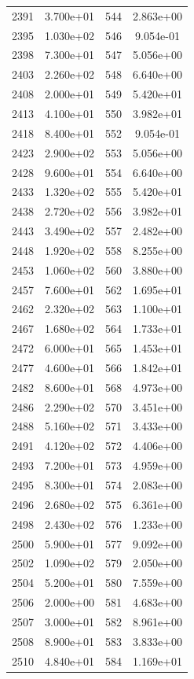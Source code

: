 \documentclass[12pt]{article}
\begin{document}
\begin{longtable}{@{}cccc@{}}
2391 & 3.700e+01 & 544 & 2.863e+00 \\
2395 & 1.030e+02 & 546 & 9.054e-01 \\
2398 & 7.300e+01 & 547 & 5.056e+00 \\
2403 & 2.260e+02 & 548 & 6.640e+00 \\
2408 & 2.000e+01 & 549 & 5.420e+01 \\
2413 & 4.100e+01 & 550 & 3.982e+01 \\
2418 & 8.400e+01 & 552 & 9.054e-01 \\
2423 & 2.900e+02 & 553 & 5.056e+00 \\
2428 & 9.600e+01 & 554 & 6.640e+00 \\
2433 & 1.320e+02 & 555 & 5.420e+01 \\
2438 & 2.720e+02 & 556 & 3.982e+01 \\
2443 & 3.490e+02 & 557 & 2.482e+00 \\
2448 & 1.920e+02 & 558 & 8.255e+00 \\
2453 & 1.060e+02 & 560 & 3.880e+00 \\
2457 & 7.600e+01 & 562 & 1.695e+01 \\
2462 & 2.320e+02 & 563 & 1.100e+01 \\
2467 & 1.680e+02 & 564 & 1.733e+01 \\
2472 & 6.000e+01 & 565 & 1.453e+01 \\
2477 & 4.600e+01 & 566 & 1.842e+01 \\
2482 & 8.600e+01 & 568 & 4.973e+00 \\
2486 & 2.290e+02 & 570 & 3.451e+00 \\
2488 & 5.160e+02 & 571 & 3.433e+00 \\
2491 & 4.120e+02 & 572 & 4.406e+00 \\
2493 & 7.200e+01 & 573 & 4.959e+00 \\
2495 & 8.300e+01 & 574 & 2.083e+00 \\
2496 & 2.680e+02 & 575 & 6.361e+00 \\
2498 & 2.430e+02 & 576 & 1.233e+00 \\
2500 & 5.900e+01 & 577 & 9.092e+00 \\
2502 & 1.090e+02 & 579 & 2.050e+00 \\
2504 & 5.200e+01 & 580 & 7.559e+00 \\
2506 & 2.000e+00 & 581 & 4.683e+00 \\
2507 & 3.000e+01 & 582 & 8.961e+00 \\
2508 & 8.900e+01 & 583 & 3.833e+00 \\
2510 & 4.840e+01 & 584 & 1.169e+01 \\

\end{longtable}
\end{document}
